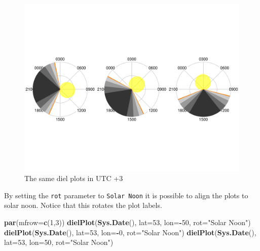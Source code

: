 \documentclass[
]{book}
\newenvironment{Shaded}{\begin{snugshade}}{\end{snugshade}}
\newcommand{\AttributeTok}[1]{\textcolor[rgb]{0.13,0.29,0.53}{#1}}
\newcommand{\DecValTok}[1]{\textcolor[rgb]{0.00,0.00,0.81}{#1}}
\newcommand{\FunctionTok}[1]{\textcolor[rgb]{0.13,0.29,0.53}{\textbf{#1}}}
\newcommand{\NormalTok}[1]{#1}
\newcommand{\SpecialCharTok}[1]{\textcolor[rgb]{0.81,0.36,0.00}{\textbf{#1}}}
\newcommand{\StringTok}[1]{\textcolor[rgb]{0.31,0.60,0.02}{#1}}
\begin{document}
\begin{figure}

{\centering \includegraphics[width=0.9\linewidth]{_main_files/figure-latex/diel-plot-tz-1} 

}

\caption{The same diel plots in UTC +3}\label{fig:diel-plot-tz}
\end{figure}

By setting the \texttt{rot} parameter to \texttt{Solar\ Noon} it is possible to align the plots to solar noon. Notice that this rotates the plot labels.

\begin{Shaded}
\begin{Highlighting}[]
\FunctionTok{par}\NormalTok{(}\AttributeTok{mfrow=}\FunctionTok{c}\NormalTok{(}\DecValTok{1}\NormalTok{,}\DecValTok{3}\NormalTok{))}
\FunctionTok{dielPlot}\NormalTok{(}\FunctionTok{Sys.Date}\NormalTok{(), }\AttributeTok{lat=}\DecValTok{53}\NormalTok{, }\AttributeTok{lon=}\SpecialCharTok{{-}}\DecValTok{50}\NormalTok{, }\AttributeTok{rot=}\StringTok{"Solar Noon"}\NormalTok{)}
\FunctionTok{dielPlot}\NormalTok{(}\FunctionTok{Sys.Date}\NormalTok{(), }\AttributeTok{lat=}\DecValTok{53}\NormalTok{, }\AttributeTok{lon=}\SpecialCharTok{{-}}\DecValTok{0}\NormalTok{, }\AttributeTok{rot=}\StringTok{"Solar Noon"}\NormalTok{)}
\FunctionTok{dielPlot}\NormalTok{(}\FunctionTok{Sys.Date}\NormalTok{(), }\AttributeTok{lat=}\DecValTok{53}\NormalTok{, }\AttributeTok{lon=}\DecValTok{50}\NormalTok{, }\AttributeTok{rot=}\StringTok{"Solar Noon"}\NormalTok{)}
\end{Highlighting}
\end{Shaded}
\end{document}
